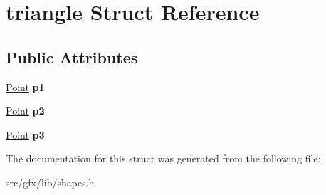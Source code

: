 \hypertarget{structtriangle}{}\section{triangle Struct Reference}
\label{structtriangle}
\subsection*{Public Attributes}
\begin{DoxyCompactItemize}
\item 
\mbox{\label{structtriangle_a28d3bdd75e7374bc90fd3204ffb31eda}} 
\hyperlink{structcoordinate}{Point} {\bfseries p1}
\item 
\mbox{\label{structtriangle_a182c0a33457493a2d75c58dcf2040d88}} 
\hyperlink{structcoordinate}{Point} {\bfseries p2}
\item 
\mbox{\label{structtriangle_a5b974d960b5c9075cb7552013cb60cf1}} 
\hyperlink{structcoordinate}{Point} {\bfseries p3}
\end{DoxyCompactItemize}


The documentation for this struct was generated from the following file\+:\begin{DoxyCompactItemize}
\item 
src/gfx/lib/shapes.\+h\end{DoxyCompactItemize}
